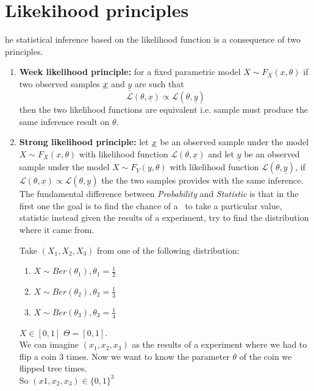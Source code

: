 \section{Likekihood principles}
he statistical inference based on the likelihood function is a consequence of two principles.
\begin{enumerate}
	\item \textbf{Week likelihood principle:} for a fixed parametric model $X\sim F_X(x,\theta)$ if two observed samples $\underline x$ and $ \underline{y}$ are such that $$\mathcal{L}(\theta,\underline x) \propto \mathcal{L}(\theta,\underline y)$$ 
	then the two likelihood functions are equivalent i.e. sample must produce the same inference result on $\theta$.
	\item \textbf{Strong likelihood principle:} let $\underline x$ be an observed sample under the model $X\sim F_X(x,\theta)$ with likelihood function $\mathcal{L}(\theta,\underline x)$ and let $\underline y$ be an observed sample under the model $X\sim F_Y(y,\theta)$ with likelihood function $\mathcal{L}(\theta,\underline y)$, if $\mathcal{L}(\theta,\underline x) \propto \mathcal{L}(\theta,\underline y)$ the the two samples provides with the same inference.\\
	The fundamental difference between \textit{Probability} and \textit{Statistic} is that in the first one the goal is to find the chance of a \rv \ to take a particular value, statistic instead given the results of a experiment, try to find the distribution where it came from.\\
	\begin{eg}
		Take $(X_1,X_2,X_3)$ from one of the following distribution:
		\begin{enumerate}
			\item $X\sim Ber(\theta_1), \theta_1=\frac{1}{2}$
			\item $X\sim Ber(\theta_2), \theta_2=\frac{1}{3}$
			\item $X\sim Ber(\theta_3), \theta_3=\frac{1}{4}$
		\end{enumerate}
	$X\in [0,1]$ $\Theta = [0,1]$.\\
	We can imagine $(x_1,x_2,x_3)$ as the results of a experiment where we had to flip a coin 3 times. Now we want to know the parameter $\theta$ of the coin we flipped tree times.
	\\So $(x1,x_2,x_3)\in \{0 ,1 \}^3$
	

\end{eg}
\end{enumerate}
